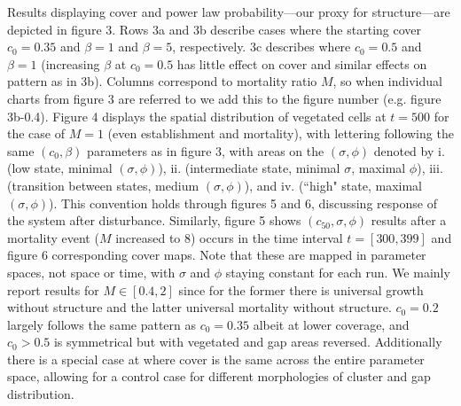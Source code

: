 \documentclass[10pt]{article}
\begin{document}
\begin{linenumbers}
Results displaying cover and power law probability---our proxy for structure---are depicted in figure 3. Rows 3a and 3b describe cases where the starting cover $c_0 = 0.35$ and $\beta = 1$ and $\beta = 5$, respectively. 3c describes where $c_0 = 0.5$ and $\beta = 1$ (increasing $\beta$ at $c_0 = 0.5$ has little effect on cover and similar effects on pattern as in 3b). Columns correspond to mortality ratio $M$, so when individual charts from figure 3 are referred to we add this to the figure number (e.g. figure 3b-0.4). Figure 4 displays the spatial distribution of vegetated cells at $t=500$ for the case of $M = 1$ (even establishment and mortality), with lettering following the same $(c_0, \beta)$ parameters as in figure 3, with areas on the $(\sigma,\phi)$ denoted by i. (low state, minimal $(\sigma,\phi)$), ii. (intermediate state, minimal $\sigma$, maximal $\phi$), iii. (transition between states, medium $(\sigma,\phi)$), and iv. (``high" state, maximal $(\sigma,\phi)$). This convention holds through figures 5 and 6, discussing response of the system after disturbance. Similarly, figure 5 shows $(c_{50}, \sigma, \phi)$ results after a mortality event ($M$ increased to 8) occurs in the time interval $t = [300,399]$ and figure 6 corresponding cover maps. Note that these are mapped in parameter spaces, not space or time, with $\sigma$ and $\phi$ staying constant for each run. We mainly report results for $M \in [0.4,2]$ since for the former there is universal growth without structure and the latter universal mortality without structure. $c_0 = 0.2$ largely follows the same pattern as $c_0 = 0.35$ albeit at lower coverage, and $c_0 > 0.5$ is symmetrical but with vegetated and gap areas reversed. Additionally there is a special case at where cover is the same across the entire parameter space, allowing for a control case for different morphologies of cluster and gap distribution. 


\end{linenumbers}
\end{document}
